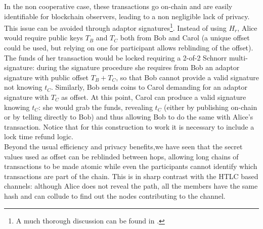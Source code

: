 \bigskip
\noindent
In the non cooperative case, these transactions go on-chain and are easily identifiable for blockchain observers, leading to a non negligible lack of privacy. This issue can be avoided through adaptor signatures\footnote{A much thorough discussion can be found in \cite{RefWork:17}.}. Instead of using $H_r$, Alice would require public keys $T_B$ and $T_C$ both from Bob and Carol (a unique offset could be used, but relying on one for participant allows reblinding of the offset). The funds of her transaction would be locked requiring a 2-of-2 Schnorr multi-signature: during the signature procedure she requires from Bob an adaptor signature with public offset $T_B + T_C$, so that Bob cannot provide a valid signature not knowing $t_C$. Similarly, Bob sends coins to Carol demanding for an adaptor signature with $T_C$ as offset. At this point, 
Carol can produce a valid signature knowing $t_C$: she would grab the funds, revealing $t_C$ (either by publishing on-chain or by telling directly to Bob) and thus allowing Bob to do the same with Alice's transaction. Notice that for this construction to work it is necessary to include a lock time refund logic.
\\
Beyond the usual efficiency and privacy benefits,we have seen that the secret values used as offset can be reblinded between hops, allowing long chains of transactions to be made atomic while even the participants cannot identify which transactions are part of the chain. This is in sharp contrast with the HTLC based channels: although Alice does not reveal the path, all the members have the same hash and can collude to find out the nodes contributing to the channel.

